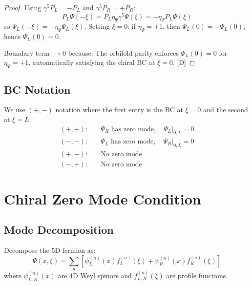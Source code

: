 \documentclass[11pt,a4paper]{article}
\begin{document}
\begin{proof}
Using $\gamma^5 P_L = -P_L$ and $\gamma^5 P_R = +P_R$:
\begin{equation}
P_L \Psi(-\xi) = P_L \eta_\Psi \gamma^5 \Psi(\xi) = -\eta_\Psi P_L \Psi(\xi)
\label{eq:parity-proof}
\end{equation}
so $\Psi_L(-\xi) = -\eta_\Psi \Psi_L(\xi)$. Setting $\xi = 0$: if $\eta_\Psi = +1$, then
$\Psi_L(0) = -\Psi_L(0)$, hence $\Psi_L(0) = 0$.

Boundary term $\to 0$ because: The orbifold parity enforces $\Psi_L(0) = 0$ for $\eta_\Psi = +1$,
automatically satisfying the chiral BC at $\xi = 0$. [D]
\end{proof}

\subsection{BC Notation}

We use $(+,-)$ notation where the first entry is the BC at $\xi = 0$ and the second at $\xi = L$:
\begin{equation}
\begin{aligned}
(+,+): &\quad \Psi_R \text{ has zero mode}, \quad \Psi_L|_{0,L} = 0 \\
(-,-): &\quad \Psi_L \text{ has zero mode}, \quad \Psi_R|_{0,L} = 0 \\
(+,-): &\quad \text{No zero mode} \\
(-,+): &\quad \text{No zero mode}
\end{aligned}
\label{eq:bc-notation}
\end{equation}

\section{Chiral Zero Mode Condition}
\label{sec:zero-mode}

\subsection{Mode Decomposition}

Decompose the 5D fermion as:
\begin{equation}
\Psi(x,\xi) = \sum_n \left[\psi_L^{(n)}(x) f_L^{(n)}(\xi) + \psi_R^{(n)}(x) f_R^{(n)}(\xi)\right]
\label{eq:mode-decomp}
\end{equation}
where $\psi_{L,R}^{(n)}(x)$ are 4D Weyl spinors and $f_{L,R}^{(n)}(\xi)$ are profile functions.
\end{document}
